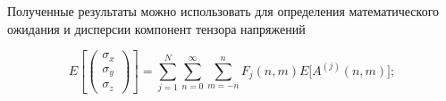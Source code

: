 
Полученные результаты можно использовать для определения математического ожидания и дисперсии компонент тензора напряжений

\begin{equation}
E\left[
\begin{pmatrix}
\sigma_x \\
\sigma_y \\
\sigma_z 
\end{pmatrix}
\right]=\sum_{j=1}^N\sum_{n=0}^\infty\sum_{m=-n}^n F_j(n,m)E\Big[A^{(j)}(n,m)\Big];
\label{eq:13:103}
\end{equation}

